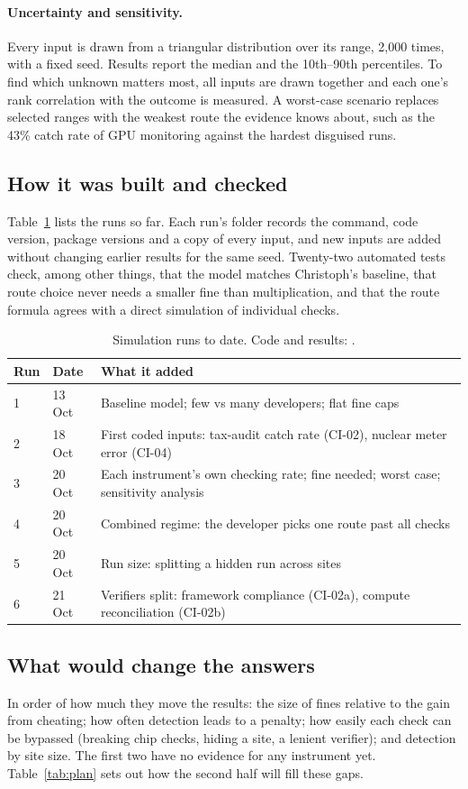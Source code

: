 \documentclass[11pt,a4paper]{article}
\newif\ifhighlight
\newenvironment{addedblock}{\ifhighlight\color{newtext}\fi}{}
\begin{document}
\begin{addedblock}
\paragraph{Uncertainty and sensitivity.} Every input is drawn from a triangular distribution over its range, 2,000 times, with a fixed seed. Results report the median and the 10th--90th percentiles. To find which unknown matters most, all inputs are drawn together and each one's rank correlation with the outcome is measured. A worst-case scenario replaces selected ranges with the weakest route the evidence knows about, such as the 43\% catch rate of GPU monitoring against the hardest disguised runs.

\subsection{How it was built and checked}
Table~\ref{tab:runs} lists the runs so far. Each run's folder records the command, code version, package versions and a copy of every input, and new inputs are added without changing earlier results for the same seed. Twenty-two automated tests check, among other things, that the model matches Christoph's baseline, that route choice never needs a smaller fine than multiplication, and that the route formula agrees with a direct simulation of individual checks.

\begin{table}[H]
\ifhighlight\color{newtext}\fi
\centering
\small
\begin{tabular}{@{}lll@{}}
\toprule
Run & Date & What it added \\
\midrule
1 & 13 Oct & Baseline model; few vs many developers; flat fine caps \\
2 & 18 Oct & First coded inputs: tax-audit catch rate (CI-02), nuclear meter error (CI-04) \\
3 & 20 Oct & Each instrument's own checking rate; fine needed; worst case; sensitivity analysis \\
4 & 20 Oct & Combined regime: the developer picks one route past all checks \\
5 & 20 Oct & Run size: splitting a hidden run across sites \\
6 & 21 Oct & Verifiers split: framework compliance (CI-02a), compute reconciliation (CI-02b) \\
\bottomrule
\end{tabular}
\caption{Simulation runs to date. Code and results: \cite{simrepo}.}
\label{tab:runs}
\end{table}

\subsection{What would change the answers}
In order of how much they move the results: the size of fines relative to the gain from cheating; how often detection leads to a penalty; how easily each check can be bypassed (breaking chip checks, hiding a site, a lenient verifier); and detection by site size. The first two have no evidence for any instrument yet. Table~\ref{tab:plan} sets out how the second half will fill these gaps.
\end{addedblock}
\end{document}
